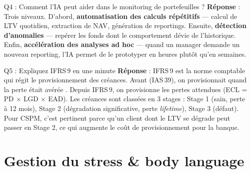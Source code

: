 \documentclass[11pt,a4paper]{article}
\begin{document}
\vspace{4pt}

\begin{graybox}{Q4 : \og Comment l'IA peut aider dans le monitoring de portefeuilles ? \fg{}}
\textbf{R\'eponse} : Trois niveaux. D'abord, \textbf{automatisation des calculs r\'ep\'etitifs}
--- calcul de LTV quotidien, extraction de NAV, g\'en\'eration de reportings.
Ensuite, \textbf{d\'etection d'anomalies} --- rep\'erer les fonds dont le
comportement d\'evie de l'historique. Enfin, \textbf{acc\'el\'eration des analyses
ad hoc} --- quand un manager demande un nouveau reporting, l'IA permet de le
prototyper en heures plut\^ot qu'en semaines.
\end{graybox}

\vspace{4pt}

\begin{graybox}{Q5 : \og Expliquez IFRS\,9 en une minute \fg{}}
\textbf{R\'eponse} : IFRS\,9 est la norme comptable qui r\'egit le provisionnement
des cr\'eances. Avant (IAS\,39), on provisionnait quand la perte \'etait \og av\'er\'ee \fg{}.
Depuis IFRS\,9, on provisionne les pertes \og attendues \fg{} (ECL = PD $\times$ LGD $\times$ EAD).
Les cr\'eances sont class\'ees en 3 stages : Stage 1 (sain, perte \`a 12 mois),
Stage 2 (d\'egradation significative, perte \textit{lifetime}), Stage 3 (d\'efaut).
Pour CSPM, c'est pertinent parce qu'un client dont le LTV se d\'egrade peut passer
en Stage 2, ce qui augmente le co\^ut de provisionnement pour la banque.
\end{graybox}

\vspace{8pt}

\section{Gestion du stress \& body language}
\end{document}
